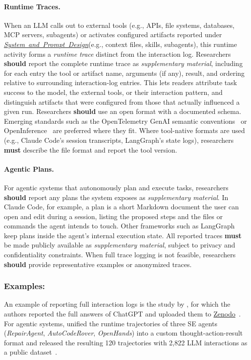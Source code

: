 \documentclass[smallextended]{svjour3}
\newcommand{\must}{\textbf{must}\xspace}
\newcommand{\should}{\textbf{should}\xspace}
\newcommand{\supplementarymaterial}{\emph{supplementary material}\xspace}
\newcommand{\supplementarymaterial}{\emph{supplementary material}\xspace}
\newcommand{\design}{\hyperref[sec:report-system-and-prompt-design]{\mbox{\emph{System and Prompt Design}}}\xspace}
\newcommand{\design}{\href{/guidelines/design/}{\emph{System and Prompt Design}}\xspace}
\newcommand{\guidelinesubsubsection}[1]{\subsubsection{\bfseries #1:}}
\newcommand{\guidelineparagraph}[1]{\paragraph{#1.}}
\newcommand{\guidelinesubsubsection}[1]{\subsubsection{#1}}
\newcommand{\guidelineparagraph}[1]{\paragraph{#1}}
\begin{document}
\guidelineparagraph{Runtime Traces}
When an LLM calls out to external tools (e.g., APIs, file systems, databases, MCP servers, subagents) or activates configured artifacts reported under \design (e.g., context files, skills, subagents), this runtime activity forms a \emph{runtime trace} distinct from the interaction log.
Researchers \should report the complete runtime trace as \supplementarymaterial, including for each entry the tool or artifact name, arguments (if any), result, and ordering relative to surrounding interaction-log entries.
This lets readers attribute task success to the model, the external tools, or their interaction pattern, and distinguish artifacts that were configured from those that actually influenced a given run.
Researchers \should use an open format with a documented schema. Emerging standards such as the OpenTelemetry GenAI semantic conventions~\cite{otel_genai_semconv} or OpenInference~\cite{openinference_spec} are preferred where they fit. Where tool-native formats are used (e.g., Claude Code's session transcripts, LangGraph's state logs), researchers \must describe the file format and report the tool version.

\guidelineparagraph{Agentic Plans}
For agentic systems that autonomously plan and execute tasks, researchers \should report any plans the system exposes as \supplementarymaterial.
In Claude Code, for example, a plan is a short Markdown document the user can open and edit during a session, listing the proposed steps and the files or commands the agent intends to touch.
Other frameworks such as LangGraph keep plans inside the agent's internal execution state.
All reported traces \must be made publicly available as \supplementarymaterial, subject to privacy and confidentiality constraints. When full trace logging is not feasible, researchers \should provide representative examples or anonymized traces.

\guidelinesubsubsection{Examples}

An example of reporting full interaction logs is the study by \citeauthor{ronanki2023investigating}, for which the authors reported the full answers of ChatGPT and uploaded them to \href{https://zenodo.org/records/8124936}{Zenodo}~\cite{ronanki2023investigating}.
For agentic systems, \citeauthor{DBLP:conf/kbse/BouzeniaP25} unified the runtime trajectories of three SE agents (\emph{RepairAgent}, \emph{AutoCodeRover}, \emph{OpenHands}) into a custom thought-action-result format and released the resulting 120 trajectories with 2,822 LLM interactions as a public dataset~\cite{DBLP:conf/kbse/BouzeniaP25}.
\end{document}
